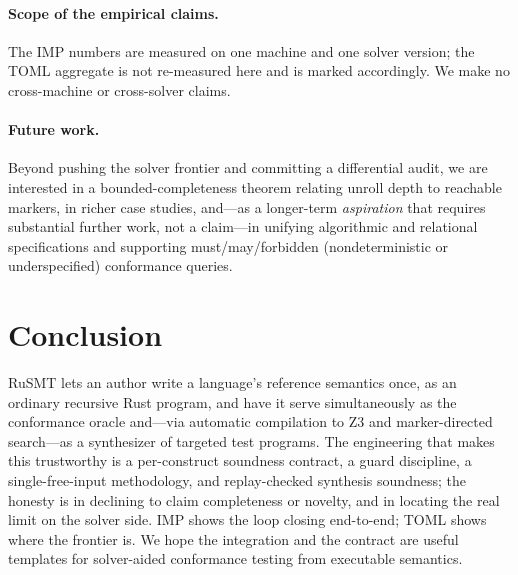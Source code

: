 \documentclass[11pt,a4paper]{article}
\theoremstyle{definition}
\theoremstyle{remark}
\newcommand{\rusmt}{RuSMT}
\newcommand{\imp}{IMP}
\newcommand{\toml}{TOML}
\begin{document}
\paragraph{Scope of the empirical claims.}
The \imp{} numbers are measured on one machine and one solver version; the
\toml{} aggregate is not re-measured here and is marked accordingly. We make no
cross-machine or cross-solver claims.

\paragraph{Future work.}
Beyond pushing the solver frontier and committing a differential audit, we are
interested in a bounded-completeness theorem relating unroll depth to reachable
markers, in richer case studies, and---as a longer-term \emph{aspiration} that
requires substantial further work, not a claim---in unifying algorithmic and
relational specifications and supporting must/may/forbidden (nondeterministic or
underspecified) conformance queries.

\section{Conclusion}
\label{sec:concl}

\rusmt{} lets an author write a language's reference semantics once, as an
ordinary recursive Rust program, and have it serve simultaneously as the
conformance oracle and---via automatic compilation to Z3 and marker-directed
search---as a synthesizer of targeted test programs. The engineering that makes
this trustworthy is a per-construct soundness contract, a guard discipline, a
single-free-input methodology, and replay-checked synthesis soundness; the
honesty is in declining to claim completeness or novelty, and in locating the
real limit on the solver side. \imp{} shows the loop closing end-to-end; \toml{}
shows where the frontier is. We hope the integration and the contract are useful
templates for solver-aided conformance testing from executable semantics.



\end{document}
